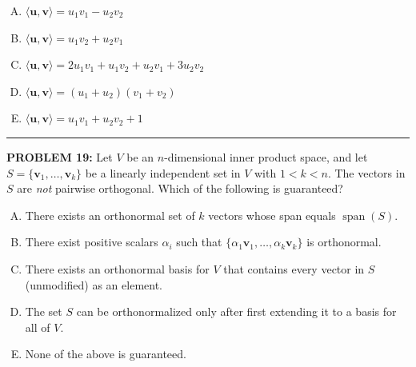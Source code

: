 \documentclass[12pt]{amsart}
\newcommand{\divider}{
  \vspace{-1em} %
  \noindent
  \raisebox{-0.15ex}{\textbullet}%
  \hspace{0.5em}%
  \rule[0.5ex]{0.95\textwidth}{1.0pt}%
  \hspace{0.5em}%
  \raisebox{-0.15ex}{\textbullet}%
  \vspace{0em} %
}
\begin{document}
\begin{enumerate}[(A)]
\item $\langle \mathbf{u}, \mathbf{v} \rangle = u_1 v_1 - u_2 v_2$
\item $\langle \mathbf{u}, \mathbf{v} \rangle = u_1 v_2 + u_2 v_1$
\item $\langle \mathbf{u}, \mathbf{v} \rangle = 2u_1 v_1 + u_1 v_2 + u_2 v_1 + 3u_2 v_2$
\item $\langle \mathbf{u}, \mathbf{v} \rangle = (u_1 + u_2)(v_1 + v_2)$
\item $\langle \mathbf{u}, \mathbf{v} \rangle = u_1 v_1 + u_2 v_2 + 1$

\end{enumerate}

%
\divider



{\bf PROBLEM 19:}
%
Let $V$ be an $n$-dimensional inner product space, and let $S = \{\mathbf{v}_1, \ldots, \mathbf{v}_k\}$ be a linearly independent set in $V$ with $1 < k < n$. The vectors in $S$ are \emph{not} pairwise orthogonal. Which of the following is guaranteed?

\begin{enumerate}[(A)]
\item There exists an orthonormal set of $k$ vectors whose span equals $\operatorname{span}(S)$.
\item There exist positive scalars $\alpha_i$ such that $\{\alpha_1\mathbf{v}_1, \ldots, \alpha_k\mathbf{v}_k\}$ is orthonormal.
\item There exists an orthonormal basis for $V$ that contains every vector in $S$ (unmodified) as an element.
\item The set $S$ can be orthonormalized only after first extending it to a basis for all of $V$.
\item None of the above is guaranteed.
\end{enumerate}
\end{document}
